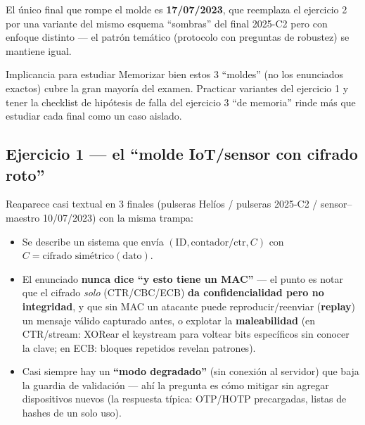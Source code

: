 El único final que rompe el molde es \textbf{17/07/2023}, que reemplaza el ejercicio 2 por
una variante del mismo esquema ``sombras'' del final 2025-C2 pero con enfoque distinto ---
el patrón temático (protocolo con preguntas de robustez) se mantiene igual.

\begin{practbox}{Implicancia para estudiar}
Memorizar bien estos 3 ``moldes'' (no los enunciados exactos) cubre la gran mayoría del
examen. Practicar variantes del ejercicio 1 y tener la checklist de hipótesis de falla del
ejercicio 3 ``de memoria'' rinde más que estudiar cada final como un caso aislado.
\end{practbox}

\subsection{Ejercicio 1 --- el ``molde IoT/sensor con cifrado roto''}
Reaparece casi textual en 3 finales (pulseras Helíos / pulseras 2025-C2 / sensor--maestro
10/07/2023) con la misma trampa:
\begin{itemize}
  \item Se describe un sistema que envía $(\mathrm{ID}, \text{contador/ctr}, C)$ con
  $C=\text{cifrado simétrico}(\text{dato})$.
  \item El enunciado \textbf{nunca dice ``y esto tiene un MAC''} --- el punto es notar que
  el cifrado \emph{solo} (CTR/CBC/ECB) \textbf{da confidencialidad pero no integridad}, y
  que sin MAC un atacante puede reproducir/reenviar (\textbf{replay}) un mensaje válido
  capturado antes, o explotar la \textbf{maleabilidad} (en CTR/stream: XORear el keystream
  para voltear bits específicos sin conocer la clave; en ECB: bloques repetidos revelan
  patrones).
  \item Casi siempre hay un \textbf{``modo degradado''} (sin conexión al servidor) que baja
  la guardia de validación --- ahí la pregunta es cómo mitigar sin agregar dispositivos
  nuevos (la respuesta típica: OTP/HOTP precargadas, listas de hashes de un solo uso).
\end{itemize}

